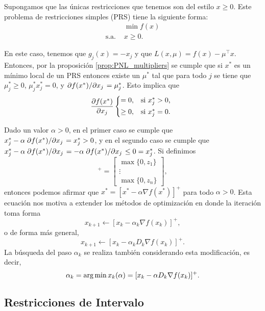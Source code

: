 Supongamos que las únicas restricciones que tenemos son del estilo \(x \geq 0\). Este problema de restricciones simples (PRS) tiene la siguiente forma:
\begin{align*}
					& \min f(x) \\
	\text{s.a. }	& x \geq 0.
\end{align*}

En este caso, tenemos que \(g_{j}(x) = -x_{j}\) y que \(L(x, \mu) = f(x) - \mu^{\top} x\). Entonces, por la proposición \ref{prop:PNL_multipliers} se cumple que si \(x^{\ast}\) es un mínimo local de un PRS entonces existe un \(\mu^{\ast}\) tal que para todo \(j\) se tiene que  \(\mu_{j}^{\ast} \geq 0\), \(\mu_{j}^{\ast}x_{j}^{\ast} = 0\), y \(\pdv*{f(x^{\ast})}{x_{j}} = \mu_{j}^{\ast}\). Esto implica que
\[ \pdv{f(x^\ast)}{x_j} \begin{dcases*}
	= 0,	& si \(x^\ast_j > 0\),\\
	\geq 0,	& si \(x^\ast_j = 0\).
\end{dcases*} \]

Dado un valor \(\alpha > 0\), en el primer caso se cumple que \(x_{j}^{\ast} - \alpha\pdv*{f(x^{\ast})}{x_{j}} = x_{j}^{\ast} > 0\), y en el segundo caso se cumple que \(x_{j}^{\ast} - \alpha \pdv*{f(x^{\ast})}{x_{j}} = -\alpha \pdv*{f(x^{\ast})}{x_{j}} \leq 0 = x_{j}^{\ast}\). Si definimos
\begin{equation*}
	[z]^+ = \begin{bmatrix}
		\max\{0, z_{1}\} \\
		\vdots \\
		\max\{0, z_n\}
	\end{bmatrix},
\end{equation*}
entonces podemos afirmar que \(x^{\ast} = [x^{\ast} - \alpha \nabla f(x^{\ast})]^{+}\) para todo \(\alpha > 0\). Esta ecuación nos motiva a extender los métodos de optimización en donde la iteración toma forma
\[x_{k+1} \gets [x_{k} - \alpha_{k} \nabla f(x_{k})]^{+},\]
o de forma más general,
\[x_{k+1} \gets [x_{k} - \alpha_{k} D_{k} \nabla f(x_{k})]^{+}.\]
La búsqueda del paso \(\alpha_{k}\) se realiza también considerando esta modificación, es decir,
\[\alpha_{k} = \operatorname*{\arg\min} x_{k}(\alpha) = [x_{k} - \alpha D_{k} \nabla f(x_{k})]^{+}.\]

\subsection{Restricciones de Intervalo}

